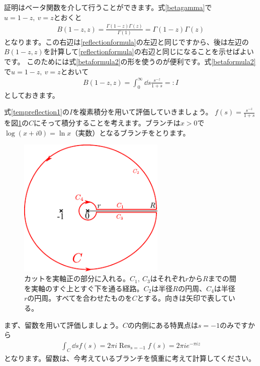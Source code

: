 \documentclass[report,paper=a4, fontsize=12pt, line_length=16cm, number_of_lines=33,dvipdfmx]{jlreq}
\numberwithin{equation}{section}
\DeclareMathOperator*{\Resi}{\mathrm{Res}}
\begin{document}
証明はベータ関数を介して行うことができます。式\eqref{betagamma}で$u=1-z,\ v=z$とおくと
\begin{align}
  B(1-z,z)=\frac{\Gamma(1-z)\Gamma(z)}{\Gamma(1)}=\Gamma(1-z)\Gamma(z)
  \label{tempreflection0}
\end{align}
となります。この右辺は\eqref{reflectionformula}の左辺と同じですから、後は左辺の$B(1-z,z)$を計算して\eqref{reflectionformula}の右辺と同じになることを示せばよいです。
このためには式\eqref{betaformula2}の形を使うのが便利です。式\eqref{betaformula2}で$u=1-z,\ v=z$とおいて
\begin{align}
  B(1-z,z)=\int_{0}^{\infty}\dd{s} \frac{s^{-z}}{1+s}=:I\label{tempreflection1}
\end{align}
としておきます。

式\eqref{tempreflection1}の$I$を複素積分を用いて評価していきましょう。
$f(s)=\frac{s^{-z}}{1+s}$を図\ref{fig:betaz1-z}の$C$にそって積分することを考えます。ブランチは$x>0$で$\log(x+i0)=\ln x$（実数）となるブランチをとります。
\begin{figure}[htbp]
  \centering
  \includegraphics[width=7cm]{betaz1-z.pdf}
  \caption{カットを実軸正の部分に入れる。$C_1,\ C_3$はそれぞれ$r$から$R$までの間を実軸のすぐ上とすぐ下を通る経路。$C_2$は半径$R$の円周、$C_4$は半径$r$の円周。すべてを合わせたものを$C$とする。向きは矢印で表している。}
  \label{fig:betaz1-z}
\end{figure}

まず、留数を用いて評価しましょう。$C$の内側にある特異点は$s=-1$のみですから
\begin{align}
  \int_{C}\dd{s}f(s)=2\pi i \Resi_{s=-1}f(s)=2\pi i e^{-\pi i z}\label{gammaresidueintegral}
\end{align}
となります。留数は、今考えているブランチを慎重に考えて計算してください。
\end{document}
